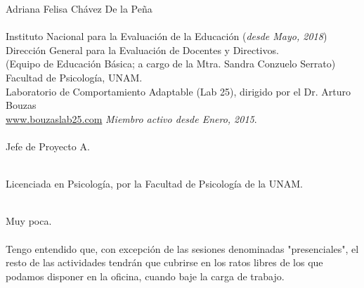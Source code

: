 \documentclass[11pt]{article}
\begin{document}

\maketitle %

\thispagestyle{empty} %

\newpage


\begin{question}

  Adriana Felisa Chávez De la Peña\\

\\  
Instituto Nacional para la Evaluación de la Educación (\textit{desde Mayo, 2018})\\
Dirección General para la Evaluación de Docentes y Directivos.\\
(Equipo de Educación Básica; a cargo de la Mtra. Sandra Conzuelo Serrato)\\

Facultad de Psicología, UNAM.\\
Laboratorio de Comportamiento Adaptable (Lab 25), dirigido por el Dr. Arturo Bouzas\\
\href{http://www.bouzaslab25.com/}{www.bouzaslab25.com}
\textit{Miembro activo desde Enero, 2015}.\\


\\
Jefe de Proyecto A.

\\
Licenciada en Psicología, por la Facultad de Psicología de la UNAM.

\\
Muy poca.\\

\\
Tengo entendido que, con excepción de las sesiones denominadas "presenciales", el resto de las actividades tendrán que cubrirse en los ratos libres de los que podamos disponer en la oficina, cuando baje la carga de trabajo.\\


\end{question}
\end{document}
